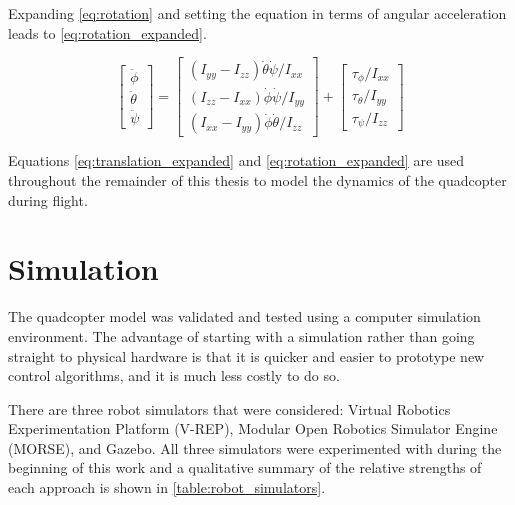 \documentclass[letterpaper,12pt,titlepage,oneside,final]{book}
\begin{document}
Expanding \eqref{eq:rotation} and setting the equation in terms of angular acceleration leads to \eqref{eq:rotation_expanded}.

\begin{equation} \label{eq:rotation_expanded}
\begin{bmatrix}
\ddot{\phi} \\
\ddot{\theta} \\
\ddot{\psi}
\end{bmatrix}
=
\begin{bmatrix}
(I_{yy} - I_{zz})\dot{\theta}\dot{\psi}/I_{xx} \\
(I_{zz} - I_{xx})\dot{\phi}\dot{\psi}/I_{yy} \\
(I_{xx} - I_{yy})\dot{\phi}\dot{\theta}/I_{zz}
\end{bmatrix}
+
\begin{bmatrix}
\tau_{\phi}/I_{xx} \\
\tau_{\theta}/I_{yy} \\
\tau_{\psi}/I_{zz}
\end{bmatrix}
\end{equation}

Equations \eqref{eq:translation_expanded} and \eqref{eq:rotation_expanded} are used throughout the remainder of this thesis to model the dynamics of the quadcopter during flight.

\section{Simulation}



The quadcopter model was validated and tested using a computer simulation environment. 
The advantage of starting with a simulation rather than going straight to physical hardware is that it is quicker and easier to prototype new control algorithms, and it is much less costly to do so. 

There are three robot simulators that were considered: Virtual Robotics Experimentation Platform (V-REP)\cite{vrep}, Modular Open Robotics Simulator Engine (MORSE)\cite{echeverria2011modular}, and Gazebo\cite{koenig2004design}. All three simulators were experimented with during the beginning of this work and a qualitative summary of the relative strengths of each approach is shown in \autoref{table:robot_simulators}.
\end{document}
